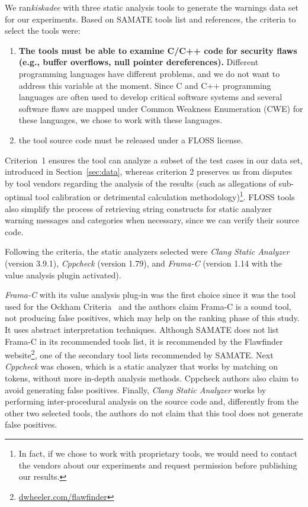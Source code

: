 We ran\textit{kiskadee} with three static analysis tools to generate the
warnings data set for our experiments. Based on SAMATE tools list and
references, the criteria to select the tools were:
\begin{enumerate}
  \item \textbf{The tools must be able to examine C/C++ code for security flaws (e.g., buffer overflows, null pointer dereferences).} Different programming languages have different problems, and we do not want to address this variable at the moment. Since C and C++ programming languages are often used to develop critical software systems and several software flaws are mapped under Common Weakness Enumeration (CWE) for these languages, we chose to work with these languages.
  \item the tool source code must be released under a FLOSS license.
\end{enumerate}
Criterion~1 ensures the tool can analyze a subset of the test cases in our data
set, introduced in Section~\ref{sec:data}, whereas criterion 2 preserves us
from disputes by tool vendors regarding the analysis of the results (such as
allegations of sub-optimal tool calibration or detrimental calculation
methodology)\footnote{In fact, if we chose
to work with
proprietary tools, we would need to contact the vendors about our experiments
and request permission before publishing our results.}. FLOSS tools also simplify the process of retrieving string
constructs for static analyzer warning messages and categories when necessary,
since we can verify their source code.

Following the criteria, the static
analyzers selected were \emph{Clang Static Analyzer} (version 3.9.1),
\emph{Cppcheck} (version 1.79), and \emph{Frama-C} (version 1.14 with the value
analysis plugin activated).

\textit{Frama-C} with its value analysis plug-in was the first choice since it
was the tool used for the Ockham Criteria~\cite{black_sate_2016} and the
authors claim Frama-C is a sound tool, not producing false positives, which may
help on the ranking phase of this study. It uses abstract interpretation
techniques. Although SAMATE does not list Frama-C in its recommended tools list, it
is recommended by the Flawfinder
website\footnote{\url{dwheeler.com/flawfinder}}, one of the secondary tool
lists recommended by SAMATE. Next \textit{Cppcheck} was chosen, which is a
static analyzer that works by matching on tokens, without more in-depth analysis
methods. Cppcheck authors also claim to avoid generating false positives.
Finally, \textit{Clang Static Analyzer} works by performing inter-procedural
analysis on the source code and, differently from the other two selected tools,
the authors do not claim that this tool does not generate false positives.

